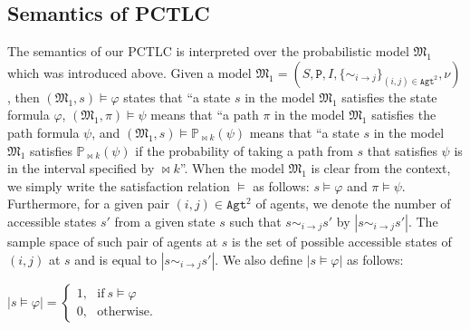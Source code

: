 \subsection{Semantics of PCTLC} \label{sec: semantics of PCTLC}

The semantics of our PCTLC is interpreted over the probabilistic model  $\mathfrak{M_1}$ which was introduced above.  Given a model $\mathfrak{M_1}=(S,\texttt{P},I,\{\sim_{i \rightarrow
j}\}_{{(i,j)}\in \texttt{Agt}^2},\nu)$, then
$(\mathfrak{M_1},s) \models \varphi$ states that ``a state $s$ in the
model $\mathfrak{M_1}$ satisfies the state formula $\varphi$,
$(\mathfrak{M_1},\pi) \models \psi$ means that ``a path $\pi$ in the
model $\mathfrak{M_1}$ satisfies the path formula $\psi$, and
$(\mathfrak{M_1},s) \models \mathbb{P}_{\bowtie k}(\psi)$ means that
``a state $s$ in the model $\mathfrak{M_1}$ satisfies
$\mathbb{P}_{\bowtie k}(\psi)$ if the probability of taking a path
from $s$ that satisfies $\psi$ is in the interval specified by
$\bowtie k$''. When the model $\mathfrak{M_1}$ is clear from the
context, we simply write the satisfaction relation $\models$ as
follows: $s \models \varphi$ and $\pi \models \psi$. Furthermore,
for a given pair $(i,j)\in \texttt{Agt}^2$ of agents, we denote
the number of accessible states $s'$ from a given state $s$ such
that $s\sim_{i\rightarrow j}s'$ by $|s\sim_{i\rightarrow j}s'|$.
The sample space of such pair of agents at $s$ is the set of
possible accessible states of $(i,j)$ at $s$ and is equal to
$|s\sim_{i\rightarrow j}s'|$. We also define $|s\models \varphi|$
as follows:

\begin{center}
$|s\models \varphi|=
\begin{cases}
1,~~~\textrm{if}~ s\models\varphi\\
0,~~~\textrm{otherwise.}
\end{cases}$
\end{center}

